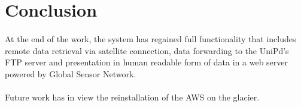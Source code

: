 \section{Conclusion}
\paragraph{}At the end of the work, the system has regained full functionality
that includes remote data retrieval via satellite connection, data forwarding
to the UniPd's FTP server and presentation in human readable form of data
in a web server powered by Global Sensor Network.
\paragraph{}Future work has in view the reinstallation of the AWS on the glacier.
